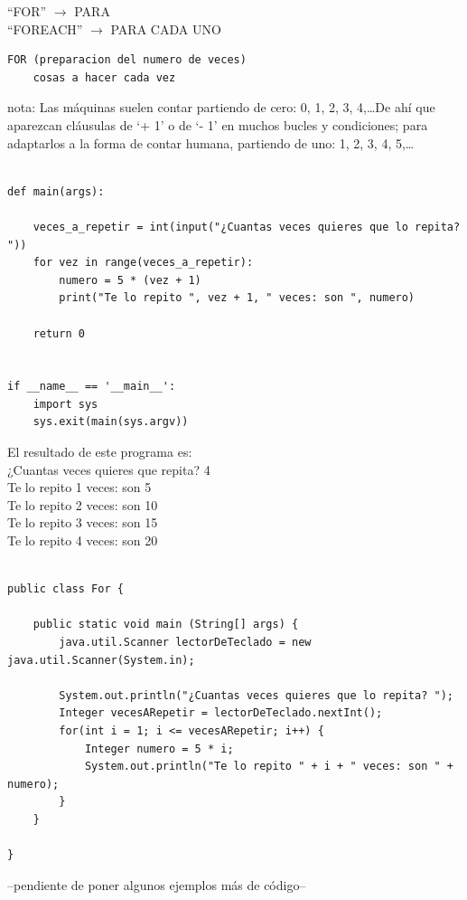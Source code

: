 \documentclass[spanish,12pt,a4paper,final,oneside]{book}
\begin{document}
``FOR'' $\rightarrow$ PARA
\\``FOREACH'' $\rightarrow$ PARA CADA UNO
\begin{lstlisting}
FOR (preparacion del numero de veces)
    cosas a hacer cada vez
\end{lstlisting}

nota: Las máquinas suelen contar partiendo de cero: 0, 1, 2, 3, 4,\ldots De ahí que aparezcan cláusulas de `+ 1' o de `- 1' en muchos bucles y condiciones; para adaptarlos a la forma de contar humana, partiendo de uno: 1, 2, 3, 4, 5,\ldots

\begin{lstlisting}[frame=single, caption=lenguaje python]

def main(args):
    
    veces_a_repetir = int(input("¿Cuantas veces quieres que lo repita? "))
    for vez in range(veces_a_repetir):
        numero = 5 * (vez + 1)
        print("Te lo repito ", vez + 1, " veces: son ", numero)
    
    return 0


if __name__ == '__main__':
    import sys
    sys.exit(main(sys.argv))
\end{lstlisting}

El resultado de este programa es:
\\¿Cuantas veces quieres que repita? 4
\\Te lo repito  1  veces: son  5
\\Te lo repito  2  veces: son  10
\\Te lo repito  3  veces: son  15
\\Te lo repito  4  veces: son  20


\begin{lstlisting}[frame=single, caption=lenguaje java]

public class For {
	
    public static void main (String[] args) {
        java.util.Scanner lectorDeTeclado = new java.util.Scanner(System.in);
        
        System.out.println("¿Cuantas veces quieres que lo repita? ");
        Integer vecesARepetir = lectorDeTeclado.nextInt();
        for(int i = 1; i <= vecesARepetir; i++) {
            Integer numero = 5 * i;
            System.out.println("Te lo repito " + i + " veces: son " + numero);
        }
    }
    
}
\end{lstlisting}

--pendiente de poner algunos ejemplos más de código--
\end{document}
